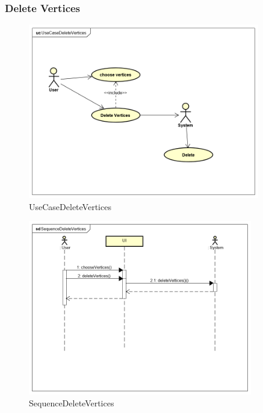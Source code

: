 \documentclass[a4paper,10pt]{article}
\begin{document}
\subsubsection{Delete Vertices}
\begin{figure}[H]
		\centering
		\includegraphics[height = 3in]{UseCaseDeleteVertices.png}
		\caption[Optional caption]{UseCaseDeleteVertices}
		\label{fig:UseCaseDeleteVertices}
	\end{figure}
	
	\begin{figure}[H]
		\centering
		\includegraphics[height = 3in]{SequenceDeleteVertices.png}
		\caption[Optional caption]{SequenceDeleteVertices}
		\label{fig:SequenceDeleteVertices}
	\end{figure}
	
\end{document}
